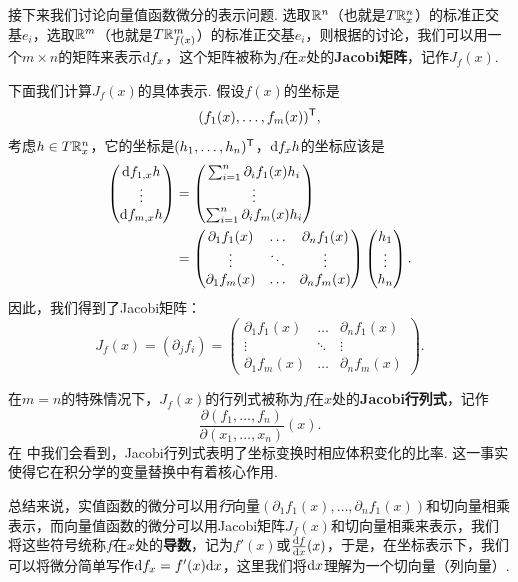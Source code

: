 接下来我们讨论向量值函数微分的表示问题. 选取$\mathbb{R}^n$（也就是$T\mathbb{R}_x^n$）的标准正交基$e_i$，选取$\mathbb{R}^m$（也就是$T\mathbb{R}^m_{f(x)}$）的标准正交基$e_i$，则根据的讨论，我们可以用一个$m\times n$的矩阵来表示$\mathrm{d} f_x$，这个矩阵被称为$f$在$x$处的\textbf{Jacobi矩阵}，记作$J_f(x)$. 

下面我们计算$J_f(x)$的具体表示. 假设$f(x)$的坐标是
\[(f_1(x),\dots,f_m(x))^{\mathsf{T}},\]
考虑$h\in T\mathbb{R}_x^n$，它的坐标是$(h_1,\dots,h_n)^{\mathsf{T}}$，$\mathrm{d} f_x h$的坐标应该是
\begin{align*}
    \begin{pmatrix}
        \mathrm{d} f_{1,x}h \\
        \vdots \\
        \mathrm{d} f_{m,x}h
    \end{pmatrix}&=
    \begin{pmatrix}
        \sum_{i=1}^n\partial_i f_1(x)h_i \\
        \vdots \\
        \sum_{i=1}^n\partial_i f_m(x)h_i
    \end{pmatrix}\\
    &=\begin{pmatrix}
        \partial_1 f_1(x) & \dots & \partial_n f_1(x) \\
        \vdots & \ddots & \vdots \\
        \partial_1 f_m(x) & \dots & \partial_n f_m(x)
    \end{pmatrix}
    \begin{pmatrix}
        h_1 \\
        \vdots \\
        h_n
    \end{pmatrix}.
\end{align*}
因此，我们得到了Jacobi矩阵：
\[J_f(x)=(\partial_j f_i)=\begin{pmatrix}
    \partial_1 f_1(x) & \dots & \partial_n f_1(x) \\
    \vdots & \ddots & \vdots \\
    \partial_1 f_m(x) & \dots & \partial_n f_m(x)
\end{pmatrix}.\]

在$m=n$的特殊情况下，$J_f(x)$的行列式被称为$f$在$x$处的\textbf{Jacobi行列式}，记作
\[\frac{\partial(f_1,\dots,f_n)}{\partial(x_1,\dots,x_n)}(x).\]
在 中我们会看到，Jacobi行列式表明了坐标变换时相应体积变化的比率. 这一事实使得它在积分学的变量替换中有着核心作用. 

总结来说，实值函数的微分可以用\textit{行}向量$(\partial_1 f_1(x),\dots,\partial_n f_1(x))$和切向量相乘表示，而向量值函数的微分可以用Jacobi矩阵$J_f(x)$和切向量相乘来表示，我们将这些符号统称$f$在$x$处的\textbf{导数}，记为$f'(x)$或$\frac{\mathrm{d} f}{\mathrm{d} x}(x)$，于是，在坐标表示下，我们可以将微分简单写作$\mathrm{d} f_x=f'(x)\mathrm{d} x$，这里我们将$\mathrm{d} x$理解为一个切向量（列向量）. 

